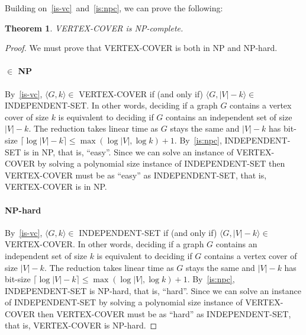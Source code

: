 \documentclass{article}
\newcommand{\theoremname}{Theorem}
\newtheorem{theorem}{\theoremname}
\newcommand{\card}[1]{|#1|}
\begin{document}
Building on~\ref{is-vc}~and~\ref{is:npc}, we can prove the following:
\begin{theorem}\label{vc:npc}
VERTEX-COVER is NP-complete.
\end{theorem}

\begin{proof}
  We must prove that VERTEX-COVER is both in NP and NP-hard.
  \paragraph{$\in$ NP}
  By~\ref{is-vc}, $\langle G,k \rangle \in$ VERTEX-COVER if (and only if)
  $\langle G,\card{V}-k\rangle \in$ INDEPENDENT-SET.
  In other words, deciding if a graph $G$ contains a vertex cover of size $k$ is
  equivalent to deciding if $G$ contains an
  independent set of size $\card{V}-k$. The reduction takes linear time as $G$ stays the
  same and $\card{V}-k$ has bit-size $\lceil\log \card{V} - k\rceil \le
  \max(\log\card{V},\log k) + 1$.
  By~\ref{is:npc}, INDEPENDENT-SET is in NP, that is, ``easy''. Since
  we can solve an instance of VERTEX-COVER by solving a polynomial size instance of
  INDEPENDENT-SET then VERTEX-COVER must be as ``easy'' as INDEPENDENT-SET, that
  is, VERTEX-COVER is in NP.

  \paragraph{NP-hard}
  By~\ref{is-vc}, $\langle G,k \rangle \in$ INDEPENDENT-SET if (and only if)
  $\langle G,\card{V}-k\rangle \in$ VERTEX-COVER.
  In other words, deciding if a graph $G$ contains an independent set of size $k$ is
  equivalent to deciding if $G$ contains a
  vertex cover of size $\card{V}-k$. The reduction takes linear time as $G$ stays the
  same and $\card{V}-k$ has bit-size $\lceil\log \card{V} - k\rceil \le
  \max(\log\card{V},\log k) + 1$.
  By~\ref{is:npc}, INDEPENDENT-SET is NP-hard, that is, ``hard''. Since
  we can solve an instance of INDEPENDENT-SET by solving a polynomial size instance of
  VERTEX-COVER then VERTEX-COVER must be as ``hard'' as INDEPENDENT-SET, that
  is, VERTEX-COVER is NP-hard.
\end{proof}
\end{document}
